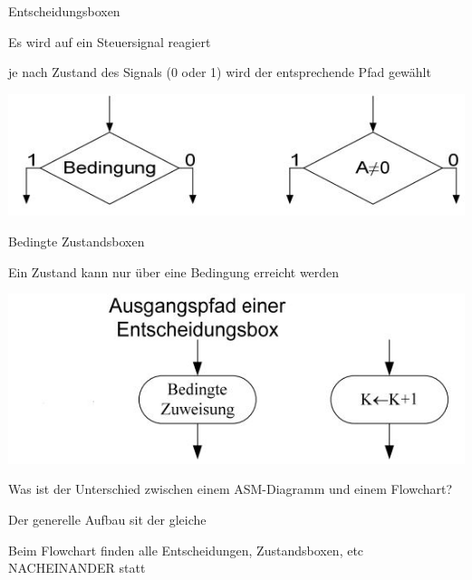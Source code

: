 \documentclass
[
  draft    = true,
  fontsize = 11pt,
  parskip  = half-,
  BCOR     = 0pt,
  DIV      = 11,
  ngerman,
  dvipsnames
]
{scrartcl}
\begin{document}
\begin{mytemize}
\begin{karsten}
\begin{mytemize}
\begin{mytemize}
\begin{mytemize}
	  				\end{mytemize}
	  		\end{mytemize}
	  		\begin{mytemize}
	  			\item Entscheidungsboxen
	  				\begin{mytemize}
	  					\item Es wird auf ein Steuersignal reagiert
	  					\item je nach Zustand des Signals (0 oder 1) wird der entsprechende Pfad gewählt
	  					\item \includegraphics[width=0.8\linewidth]{Zeichnungen/ASM-Entscheidungsbox}
	  				\end{mytemize}
	  		\end{mytemize}
		  	\begin{mytemize}
		  		\item Bedingte Zustandsboxen
		  			\begin{mytemize}
		  				\item Ein Zustand kann nur über eine Bedingung erreicht werden
		  				\item \includegraphics[width=0.8\linewidth]{Zeichnungen/ASM-Bed-Zustandsbox}
		  			\end{mytemize}
		  	\end{mytemize}
	  	\end{mytemize}
	  \end{karsten}
  \item Was ist der Unterschied zwischen einem ASM-Diagramm und einem Flowchart?
  	\begin{karsten}
  		\begin{mytemize}
  			\item Der generelle Aufbau sit der gleiche
  			\item Beim Flowchart finden alle Entscheidungen, Zustandsboxen, etc NACHEINANDER statt

\end{mytemize}
\end{karsten}
\end{mytemize}
\end{document}
